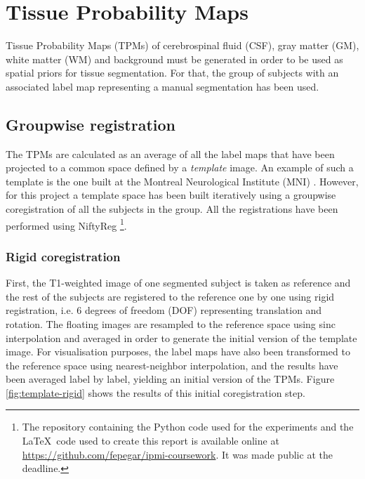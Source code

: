\section{Tissue Probability Maps}

Tissue Probability Maps (TPMs) of cerebrospinal fluid (CSF), gray matter (GM), white matter (WM) and background must be generated in order to be used as spatial priors for tissue segmentation. For that, the group of subjects with an associated label map representing a manual segmentation has been used.


\subsection{Groupwise registration}
The TPMs are calculated as an average of all the label maps that have been projected to a common space defined by a \textit{template} image. An example of such a template is the one built at the Montreal Neurological Institute (MNI) \cite{evans_3d_1993}. However, for this project a template space has been built iteratively using a groupwise coregistration of all the subjects in the group. All the registrations have been performed using NiftyReg \cite{modat_global_2014}\footnote{The repository containing the Python code used for the experiments and the \LaTeX\ code used to create this report is available online at \href{https://github.com/fepegar/ipmi-coursework}{https://github.com/fepegar/ipmi-coursework}. It was made public at the deadline.}.


\subsubsection{Rigid coregistration}
First, the T1-weighted image of one segmented subject is taken as reference and the rest of the subjects are registered to the reference one by one using rigid registration, i.e. 6 degrees of freedom (DOF) representing translation and rotation. The floating images are resampled to the reference space using sinc interpolation and averaged in order to generate the initial version of the template image. For visualisation purposes, the label maps have also been transformed to the reference space using nearest-neighbor interpolation, and the results have been averaged label by label, yielding an initial version of the TPMs. Figure \ref{fig:template-rigid} shows the results of this initial coregistration step.

